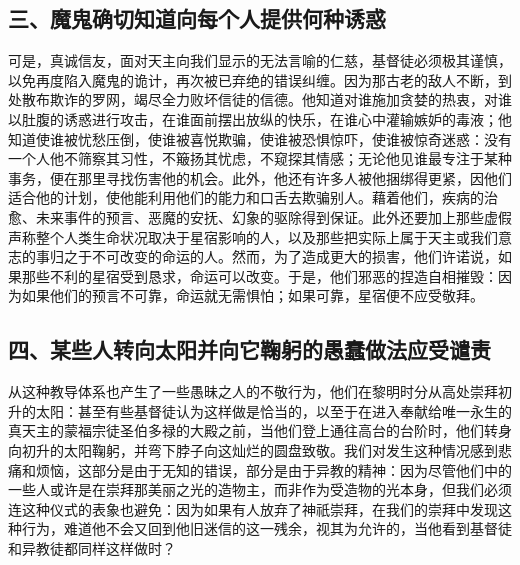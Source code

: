
\subsection{三、魔鬼确切知道向每个人提供何种诱惑}

可是，真诚信友，面对天主向我们显示的无法言喻的仁慈，基督徒必须极其谨慎，以免再度陷入魔鬼的诡计，再次被已弃绝的错误纠缠。因为那古老的敌人不断，到处散布欺诈的罗网，竭尽全力败坏信徒的信德。他知道对谁施加贪婪的热衷，对谁以肚腹的诱惑进行攻击，在谁面前摆出放纵的快乐，在谁心中灌输嫉妒的毒液；他知道使谁被忧愁压倒，使谁被喜悦欺骗，使谁被恐惧惊吓，使谁被惊奇迷惑：没有一个人他不筛察其习性，不簸扬其忧虑，不窥探其情感；无论他见谁最专注于某种事务，便在那里寻找伤害他的机会。此外，他还有许多人被他捆绑得更紧，因他们适合他的计划，使他能利用他们的能力和口舌去欺骗别人。藉着他们，疾病的治愈、未来事件的预言、恶魔的安抚、幻象的驱除得到保证。此外还要加上那些虚假声称整个人类生命状况取决于星宿影响的人，以及那些把实际上属于天主或我们意志的事归之于不可改变的命运的人。然而，为了造成更大的损害，他们许诺说，如果那些不利的星宿受到恳求，命运可以改变。于是，他们邪恶的捏造自相摧毁：因为如果他们的预言不可靠，命运就无需惧怕；如果可靠，星宿便不应受敬拜。\par


\subsection{四、某些人转向太阳并向它鞠躬的愚蠢做法应受谴责}

从这种教导体系也产生了一些愚昧之人的不敬行为，他们在黎明时分从高处崇拜初升的太阳：甚至有些基督徒认为这样做是恰当的，以至于在进入奉献给唯一永生的真天主的蒙福宗徒圣伯多禄的大殿之前，当他们登上通往高台的台阶时，他们转身向初升的太阳鞠躬，并弯下脖子向这灿烂的圆盘致敬。我们对发生这种情况感到悲痛和烦恼，这部分是由于无知的错误，部分是由于异教的精神：因为尽管他们中的一些人或许是在崇拜那美丽之光的造物主，而非作为受造物的光本身，但我们必须连这种仪式的表象也避免：因为如果有人放弃了神祇崇拜，在我们的崇拜中发现这种行为，难道他不会又回到他旧迷信的这一残余，视其为允许的，当他看到基督徒和异教徒都同样这样做时？\par


